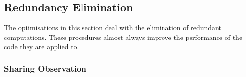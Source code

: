 % 


\subsection{Redundancy Elimination}
\label{sec:redundancy_elimination}

The optimisations in this section deal with the elimination of redundant
computations. These procedures almost always improve the performance of the code
they are applied to.

\subsubsection{Sharing Observation}


